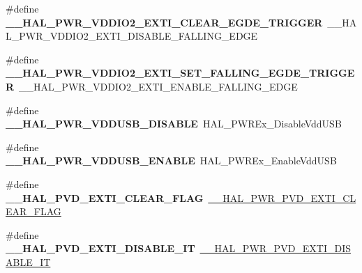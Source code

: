 \begin{DoxyCompactItemize}
\item 
\#define {\bfseries \+\_\+\+\_\+\+H\+A\+L\+\_\+\+P\+W\+R\+\_\+\+V\+D\+D\+I\+O2\+\_\+\+E\+X\+T\+I\+\_\+\+C\+L\+E\+A\+R\+\_\+\+E\+G\+D\+E\+\_\+\+T\+R\+I\+G\+G\+ER}~\+\_\+\+\_\+\+H\+A\+L\+\_\+\+P\+W\+R\+\_\+\+V\+D\+D\+I\+O2\+\_\+\+E\+X\+T\+I\+\_\+\+D\+I\+S\+A\+B\+L\+E\+\_\+\+F\+A\+L\+L\+I\+N\+G\+\_\+\+E\+D\+GE\hypertarget{group___h_a_l___p_w_r___aliased___macros_ga93b3f07014857ba319c24a7e3e8b7ed0}{}\label{group___h_a_l___p_w_r___aliased___macros_ga93b3f07014857ba319c24a7e3e8b7ed0}

\item 
\#define {\bfseries \+\_\+\+\_\+\+H\+A\+L\+\_\+\+P\+W\+R\+\_\+\+V\+D\+D\+I\+O2\+\_\+\+E\+X\+T\+I\+\_\+\+S\+E\+T\+\_\+\+F\+A\+L\+L\+I\+N\+G\+\_\+\+E\+G\+D\+E\+\_\+\+T\+R\+I\+G\+G\+ER}~\+\_\+\+\_\+\+H\+A\+L\+\_\+\+P\+W\+R\+\_\+\+V\+D\+D\+I\+O2\+\_\+\+E\+X\+T\+I\+\_\+\+E\+N\+A\+B\+L\+E\+\_\+\+F\+A\+L\+L\+I\+N\+G\+\_\+\+E\+D\+GE\hypertarget{group___h_a_l___p_w_r___aliased___macros_gab5cb9dc5b115d7af7a361bf073af54b4}{}\label{group___h_a_l___p_w_r___aliased___macros_gab5cb9dc5b115d7af7a361bf073af54b4}

\item 
\#define {\bfseries \+\_\+\+\_\+\+H\+A\+L\+\_\+\+P\+W\+R\+\_\+\+V\+D\+D\+U\+S\+B\+\_\+\+D\+I\+S\+A\+B\+LE}~H\+A\+L\+\_\+\+P\+W\+R\+Ex\+\_\+\+Disable\+Vdd\+U\+SB\hypertarget{group___h_a_l___p_w_r___aliased___macros_ga203b7ebde33c1eb9c99f0ac45fa521e7}{}\label{group___h_a_l___p_w_r___aliased___macros_ga203b7ebde33c1eb9c99f0ac45fa521e7}

\item 
\#define {\bfseries \+\_\+\+\_\+\+H\+A\+L\+\_\+\+P\+W\+R\+\_\+\+V\+D\+D\+U\+S\+B\+\_\+\+E\+N\+A\+B\+LE}~H\+A\+L\+\_\+\+P\+W\+R\+Ex\+\_\+\+Enable\+Vdd\+U\+SB\hypertarget{group___h_a_l___p_w_r___aliased___macros_ga56a0796742be5992269988f4509011fe}{}\label{group___h_a_l___p_w_r___aliased___macros_ga56a0796742be5992269988f4509011fe}

\item 
\#define {\bfseries \+\_\+\+\_\+\+H\+A\+L\+\_\+\+P\+V\+D\+\_\+\+E\+X\+T\+I\+\_\+\+C\+L\+E\+A\+R\+\_\+\+F\+L\+AG}~\hyperlink{group___p_w_r___exported___macro_gac0fb2218bc050f5d8fdb1a3f28590352}{\+\_\+\+\_\+\+H\+A\+L\+\_\+\+P\+W\+R\+\_\+\+P\+V\+D\+\_\+\+E\+X\+T\+I\+\_\+\+C\+L\+E\+A\+R\+\_\+\+F\+L\+AG}\hypertarget{group___h_a_l___p_w_r___aliased___macros_ga534279f1d4354f4372991fe757acad7c}{}\label{group___h_a_l___p_w_r___aliased___macros_ga534279f1d4354f4372991fe757acad7c}

\item 
\#define {\bfseries \+\_\+\+\_\+\+H\+A\+L\+\_\+\+P\+V\+D\+\_\+\+E\+X\+T\+I\+\_\+\+D\+I\+S\+A\+B\+L\+E\+\_\+\+IT}~\hyperlink{group___p_w_r___exported___macro_gad240d7bf8f15191b068497b9aead1f1f}{\+\_\+\+\_\+\+H\+A\+L\+\_\+\+P\+W\+R\+\_\+\+P\+V\+D\+\_\+\+E\+X\+T\+I\+\_\+\+D\+I\+S\+A\+B\+L\+E\+\_\+\+IT}\hypertarget{group___h_a_l___p_w_r___aliased___macros_gaaeb62592dbf02f8aa76ac2941090e0ed}{}\label{group___h_a_l___p_w_r___aliased___macros_gaaeb62592dbf02f8aa76ac2941090e0ed}


\end{DoxyCompactItemize}
